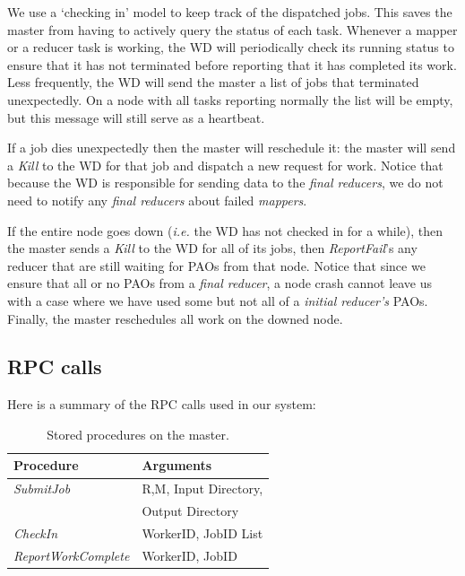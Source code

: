 \documentclass[10pt,letter,final,article,twocolumn]{article} %
\newcommand{\rpc}[1]{\emph{#1}}
\begin{document}
We use a `checking in' model to keep track of the dispatched jobs. This saves the master from having to actively query the status of each task. Whenever a mapper or a reducer task is working, the WD will periodically check its running status to ensure that it has not terminated before reporting that it has completed its work. Less frequently, the WD will send the master a list of jobs that terminated unexpectedly. On a node with all tasks reporting normally the list will be empty, but this message will still serve as a heartbeat.

If a job dies unexpectedly then the master will reschedule it: the master will send a \rpc{Kill} to the WD for that job and dispatch a new request for work. Notice that because the WD is responsible for sending data to the \emph{final reducers}, we do not need to notify any \emph{final reducers} about failed \emph{mappers}. 

If the entire node goes down (\textit{i.e.} the WD has not checked in for a while), then the master sends a \rpc{Kill} to the WD for all of its jobs, then \rpc{ReportFail}'s any reducer that are still waiting for PAOs from that node. Notice that since we ensure that all or no PAOs from a \emph{final reducer}, a node crash cannot leave us with a case where we have used some but not all of a \emph{initial reducer's} PAOs. Finally, the master reschedules all work on the downed node.

\subsection{RPC calls}

Here is a summary of the RPC calls used in our system:

\begin{table}[htdp]
\caption{Stored procedures on the master.}
\begin{center}
\begin{tabular}{|l|l|}\hline
\textbf{Procedure} & \textbf{Arguments}\\\hline
\rpc{SubmitJob} & R,M, Input Directory,\\
&\qquad  Output Directory\\
\rpc{CheckIn} & WorkerID, JobID List\\
\rpc{ReportWorkComplete} & WorkerID, JobID\\\hline
\end{tabular}
\end{center}
\label{tab:master_rpc}
\end{table}%
\end{document}
